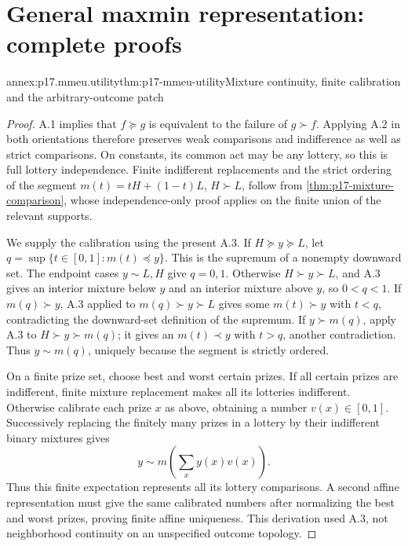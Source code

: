 \section{General maxmin representation: complete proofs}
\label{sec:annex-p17-maxmin-representation}

\begin{annexitem}{annex:p17.mmeu.utility}{thm:p17-mmeu-utility}{Mixture continuity, finite calibration and the arbitrary-outcome patch}
\begin{proof}
A.1 implies that \(f\succeq g\) is equivalent to the
failure of \(g\succ f\). Applying A.2 in both orientations
therefore preserves weak comparisons and indifference as
well as strict comparisons. On constants, its common
act may be any lottery, so this is full lottery
independence. Finite indifferent replacements and the
strict ordering of the segment
\(m(t)=tH+(1-t)L\), \(H\succ L\), follow from
\cref{thm:p17-mixture-comparison}, whose independence-only
proof applies on the finite union of the relevant supports.

We supply the calibration using the present A.3.
If \(H\succeq y\succeq L\), let
\(q=\sup\{t\in[0,1]:m(t)\preceq y\}\).
This is the supremum of a nonempty downward set.
The endpoint cases \(y\sim L,H\) give \(q=0,1\).
Otherwise \(H\succ y\succ L\), and A.3 gives an
interior mixture below \(y\) and an interior mixture
above \(y\), so \(0<q<1\).
If \(m(q)\succ y\), A.3 applied to
\(m(q)\succ y\succ L\) gives some
\(m(t)\succ y\) with \(t<q\), contradicting the
downward-set definition of the supremum.
If \(y\succ m(q)\), apply A.3 to
\(H\succ y\succ m(q)\); it gives an \(m(t)\prec y\)
with \(t>q\), another contradiction.
Thus \(y\sim m(q)\), uniquely because the segment
is strictly ordered.

On a finite prize set, choose best and worst certain
prizes. If all certain prizes are indifferent, finite
mixture replacement makes all its lotteries indifferent.
Otherwise calibrate each prize \(x\) as above, obtaining
a number \(v(x)\in[0,1]\).
Successively replacing the finitely many prizes in a
lottery by their indifferent binary mixtures gives
\[
             y\sim m\!\left(\sum_x y(x)v(x)\right).
\]
Thus this finite expectation represents all its lottery
comparisons. A second affine representation must give
the same calibrated numbers after normalizing the best
and worst prizes, proving finite affine uniqueness.
This derivation used A.3, not neighborhood continuity
on an unspecified outcome topology.


\end{proof}
\end{annexitem}

